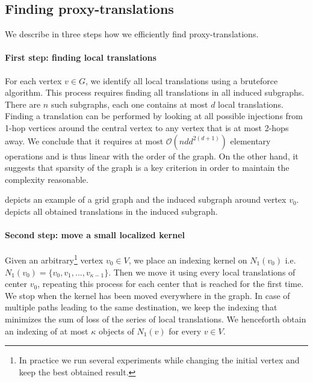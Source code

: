 
\subsection{Finding proxy-translations}
\label{sec:alg}

We describe in three steps how we efficiently find proxy-translations.

\paragraph{First step: finding local translations}

For each vertex $v \in G$, we identify all local translations using a bruteforce algorithm. This process requires finding all translations in all induced subgraphs. There are $n$ such subgraphs, each one contains at most $d$ local translations. Finding a translation can be performed by looking at all possible injections from 1-hop vertices around the central vertex to any vertex that is at most 2-hops away. We conclude that it requires at most $\mathcal{O}(nd d^{2(d+1)})$ elementary operations and is thus linear with the order of the graph. On the other hand, it suggests that sparsity of the graph is a key criterion in order to maintain the complexity reasonable.

 depicts an example of a grid graph and the induced subgraph around vertex $v_0$.  depicts all obtained translations in the induced subgraph.




\paragraph{Second step: move a small localized kernel}

Given an arbitrary\footnote{In practice we run several experiments while changing the initial vertex and keep the best obtained result.} vertex $v_0 \in V$, we place an indexing kernel on $N_1(v_0)$ i.e. $N_1(v_0) = \{v_0, v_1, ..., v_{\kappa-1}\}$. Then we move it using every local translations of center $v_0$, repeating this process for each center that is reached for the first time. We stop when the kernel has been moved everywhere in the graph. In case of multiple paths leading to the same destination, we keep the indexing that minimizes the sum of loss of the series of local translations. We henceforth obtain an indexing of at most $\kappa$ objects of $N_1(v)$ for every $v \in V$.


